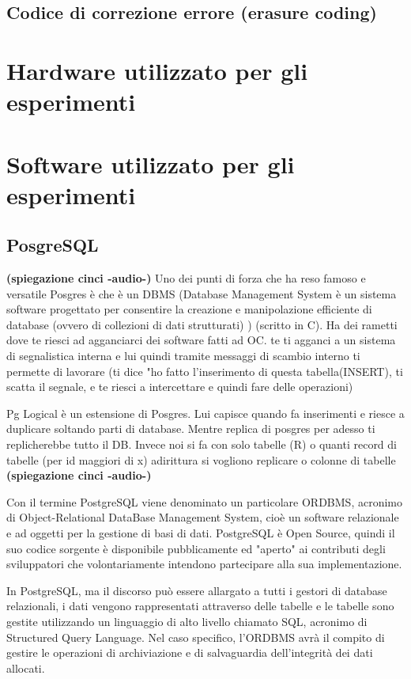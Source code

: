 \subsection{Codice di correzione errore (erasure coding)}
\section{Hardware utilizzato per gli esperimenti}
\section{Software utilizzato per gli esperimenti}
\subsection{PosgreSQL}

\textbf{(spiegazione cinci -audio-)}
Uno dei punti di forza che ha reso famoso e versatile Posgres è che è un DBMS (Database Management System è un sistema software progettato per consentire la creazione e manipolazione efficiente di database (ovvero di collezioni di dati strutturati) ) (scritto in C). Ha dei rametti dove te riesci ad agganciarci dei software fatti ad OC. te ti agganci a un sistema di segnalistica interna e lui quindi tramite messaggi di scambio interno ti permette di lavorare (ti dice "ho fatto l'inserimento di questa tabella(INSERT), ti scatta il segnale, e te riesci a intercettare e quindi fare delle operazioni)

Pg Logical è un estensione di Posgres. Lui capisce quando fa inserimenti e riesce a duplicare soltando parti di database. Mentre replica di posgres per adesso ti replicherebbe tutto il DB. Invece noi si fa con solo tabelle (R) o quanti record di tabelle (per id maggiori di x) adirittura si vogliono replicare o colonne di tabelle \\
\textbf{(spiegazione cinci -audio-)}


Con il termine PostgreSQL viene denominato un particolare ORDBMS, acronimo di Object-Relational DataBase Management System, cioè un software relazionale e ad oggetti per la gestione di basi di dati.
PostgreSQL è Open Source, quindi il suo codice sorgente è disponibile pubblicamente ed "aperto" ai contributi degli sviluppatori che volontariamente intendono partecipare alla sua implementazione.

In PostgreSQL, ma il discorso può essere allargato a tutti i gestori di database relazionali, i dati vengono rappresentati attraverso delle tabelle e le tabelle sono gestite utilizzando un linguaggio di alto livello chiamato SQL, acronimo di Structured Query Language.
Nel caso specifico, l'ORDBMS avrà il compito di gestire le operazioni di archiviazione e di salvaguardia dell'integrità dei dati allocati.

